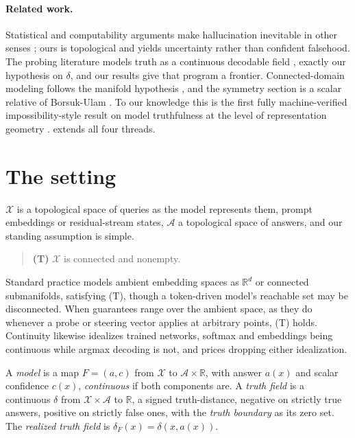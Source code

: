 \documentclass[mlmain,onecolumn]{jmlr}
\newcommand{\X}{\mathcal{X}}
\newcommand{\A}{\mathcal{A}}
\newcommand{\R}{\mathbb{R}}
\newcommand{\conf}{c}
\newcommand{\dF}{\delta_{\!F}}
\begin{document}
\paragraph{Related work.}
Statistical and computability arguments make hallucination
inevitable in other senses
\citep{kalai2024calibrated,kalai2025why,xu2024hallucination}; ours
is topological and yields uncertainty rather than confident
falsehood. The probing literature models truth as a continuous
decodable field
\citep{marks2024geometry,burns2023discovering,azaria2023internal,li2023inference,zou2023representation,park2024linear},
exactly our hypothesis on $\delta$, and our results give that
program a frontier. Connected-domain modeling follows the manifold
hypothesis \citep{fefferman2016testing,cai2021isotropy}, and the
symmetry section is a scalar relative of Borsuk-Ulam
\citep{borsuk1933drei,matousek2003using}. To our knowledge this is
the first fully machine-verified impossibility-style result on
model truthfulness at the level of representation geometry
\citep{moura2021lean,mathlib2020}. 
extends all four threads.

\section{The setting}
\label{sec:setting}

$\X$ is a topological space of queries as the model represents
them, prompt embeddings or residual-stream states, $\A$ a
topological space of answers, and our standing assumption is simple.

\begin{quote}
\textbf{(T)} $\X$ is connected and nonempty.
\end{quote}

Standard practice models ambient embedding spaces as $\R^d$ or
connected submanifolds, satisfying (T), though a token-driven
model's reachable set may be disconnected. When guarantees range
over the ambient space, as they do whenever a probe or steering
vector applies at arbitrary points, (T) holds. Continuity likewise
idealizes trained networks, softmax and embeddings being continuous
while argmax decoding is not, and  prices
dropping either idealization.

\begin{definition}
\label{def:model}
A \emph{model} is a map $F = (a, \conf)$ from $\X$ to
$\A \times \R$, with answer $a(x)$ and scalar confidence $\conf(x)$,
\emph{continuous} if both components are. A \emph{truth field} is a
continuous $\delta$ from $\X \times \A$ to $\R$, a signed
truth-distance, negative on strictly true answers, positive on
strictly false ones, with the \emph{truth boundary} as its zero set.
The \emph{realized truth field} is $\dF(x) = \delta(x, a(x))$.
\end{definition}
\end{document}
